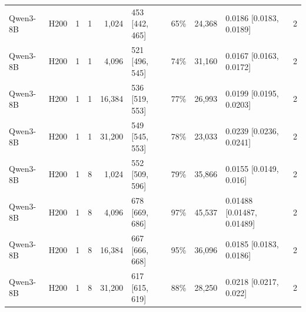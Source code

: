 \begin{landscape}
\begin{longtable}{llrrrlrrlr}
Qwen3-8B & H200 & 1 & 1 & 1,024 & 453 {[}442, 465{]} & 65\% & 24,368 & 0.0186 {[}0.0183, 0.0189{]} & 2 \\
Qwen3-8B & H200 & 1 & 1 & 4,096 & 521 {[}496, 545{]} & 74\% & 31,160 & 0.0167 {[}0.0163, 0.0172{]} & 2 \\
Qwen3-8B & H200 & 1 & 1 & 16,384 & 536 {[}519, 553{]} & 77\% & 26,993 & 0.0199 {[}0.0195, 0.0203{]} & 2 \\
Qwen3-8B & H200 & 1 & 1 & 31,200 & 549 {[}545, 553{]} & 78\% & 23,033 & 0.0239 {[}0.0236, 0.0241{]} & 2 \\
Qwen3-8B & H200 & 1 & 8 & 1,024 & 552 {[}509, 596{]} & 79\% & 35,866 & 0.0155 {[}0.0149, 0.016{]} & 2 \\
Qwen3-8B & H200 & 1 & 8 & 4,096 & 678 {[}669, 686{]} & 97\% & 45,537 & 0.01488 {[}0.01487, 0.01489{]} & 2 \\
Qwen3-8B & H200 & 1 & 8 & 16,384 & 667 {[}666, 668{]} & 95\% & 36,096 & 0.0185 {[}0.0183, 0.0186{]} & 2 \\
Qwen3-8B & H200 & 1 & 8 & 31,200 & 617 {[}615, 619{]} & 88\% & 28,250 & 0.0218 {[}0.0217, 0.022{]} & 2 \\
\end{longtable}
\endgroup
\end{landscape}
\restoregeometry
